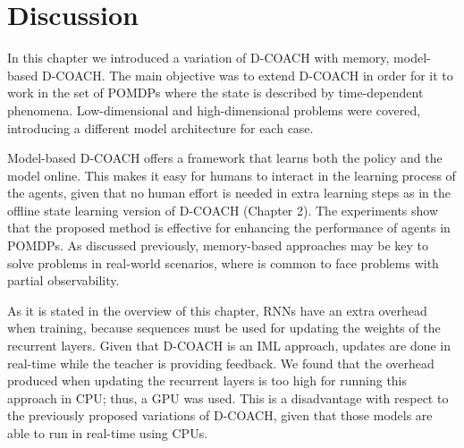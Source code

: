 \section{Discussion}
In this chapter we introduced a variation of D-COACH with memory, model-based D-COACH. The main objective was to extend D-COACH in order for it to work in the set of POMDPs where the state is described by time-dependent phenomena. Low-dimensional and high-dimensional problems were covered, introducing a different model architecture for each case. 

Model-based D-COACH offers a framework that learns both the policy and the model online. This makes it easy for humans to interact in the learning process of the agents, given that no human effort is needed in extra learning steps as in the offline state learning version of D-COACH (Chapter 2). The experiments show that the proposed method is effective for enhancing the performance of agents in POMDPs. As discussed previously, memory-based approaches may be key to solve problems in real-world scenarios, where is common to face problems with partial observability. 

As it is stated in the overview of this chapter, RNNs have an extra overhead when training, because sequences must be used for updating the weights of the recurrent layers. Given that D-COACH is an IML approach, updates are done in real-time while the teacher is providing feedback. We found that the overhead produced when updating the recurrent layers is too high for running this approach in CPU; thus, a GPU was used. This is a disadvantage with respect to the previously proposed variations of D-COACH, given that those models are able to run in real-time using CPUs. 
